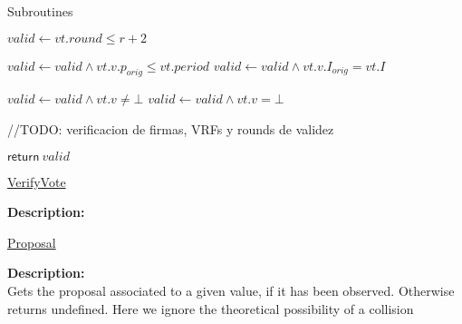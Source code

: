 \documentclass[10pt,a4paper]{article}
\begin{document}
\begin{section}{Subroutines}
\begin{algorithm}[H]\label{algo:verify-vote}
    \begin{algorithmic}[1]
        \State $valid \gets vt.round \leq r+2$
        
            \State $valid \gets valid \land vt.v.p_{orig} \leq vt.period$
                \State $valid \gets valid \land vt.v.I_{orig} = vt.I$
            \EndIf
        \EndIf
        
            \State $valid \gets valid \land vt.v \neq \bot$
            \State $valid \gets valid \land vt.v = \bot$
        \EndIf

        //TODO: verificacion de firmas, VRFs y rounds de validez

        \State $\mathsf{return} \ valid$
    \EndFunction
    \end{algorithmic}
    \caption{\underline{VerifyVote}}
\end{algorithm}

\noindent \textbf{Description:}\\


\begin{algorithm}[H]
    \begin{algorithmic}[1]

        
    \EndIf

    \EndFunction
    \end{algorithmic}
    \caption{\underline{Proposal}}
\end{algorithm}

\noindent \textbf{Description:}\\ Gets the proposal associated to a given value, if it has been observed.
Otherwise returns undefined. Here we ignore the theoretical possibility of a collision


\begin{algorithm}[H]\label{proposal-value}
    \begin{algorithmic}[1]


\end{algorithmic}
\end{algorithm}
\end{section}
\end{document}
